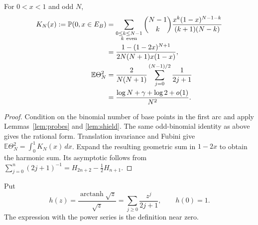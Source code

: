 \documentclass[11pt,letterpaper]{article}
\newcommand{\PP}{\mathbb P}\newcommand{\EE}{\mathbb E}
\begin{document}
\begin{proposition}\label{prop:two-point}
For $0<x<1$ and odd $N$,
\begin{align}
 K_N(x):=\PP(0,x\in E_B)
 &=\sum_{\substack{0\le k\le N-1\\k\ {\rm even}}}
 \binom{N-1}{k}\frac{x^k(1-x)^{N-1-k}}{(k+1)(N-k)}\notag\\
 &=\frac{1-(1-2x)^{N+1}}{2N(N+1)x(1-x)},\label{eq:two-point}\\
 \EE\Theta_N^2
 &=\frac{2}{N(N+1)}\sum_{j=0}^{(N-1)/2}\frac1{2j+1}\notag\\
 &=\frac{\log N+\gamma+\log2+o(1)}{N^2}.\label{eq:theta-second}
\end{align}
\end{proposition}
\begin{proof}
Condition on the binomial number of base points in the first arc and apply
Lemmas~\ref{lem:probes} and \ref{lem:shield}. The same odd-binomial identity
as above gives the rational form. Translation invariance and Fubini give
$\EE\Theta_N^2=\int_0^1K_N(x)\,dx$. Expand the resulting geometric sum in
$1-2x$ to obtain the harmonic sum. Its asymptotic follows from
$\sum_{j=0}^{n}(2j+1)^{-1}=H_{2n+2}-\tfrac12H_{n+1}$.
\end{proof}

Put
\begin{equation}\label{eq:h}
 h(z)=\frac{\operatorname{arctanh}\sqrt z}{\sqrt z}
 =\sum_{j\ge0}\frac{z^j}{2j+1},\qquad h(0)=1.
\end{equation}
The expression with the power series is the definition near zero.
\end{document}

